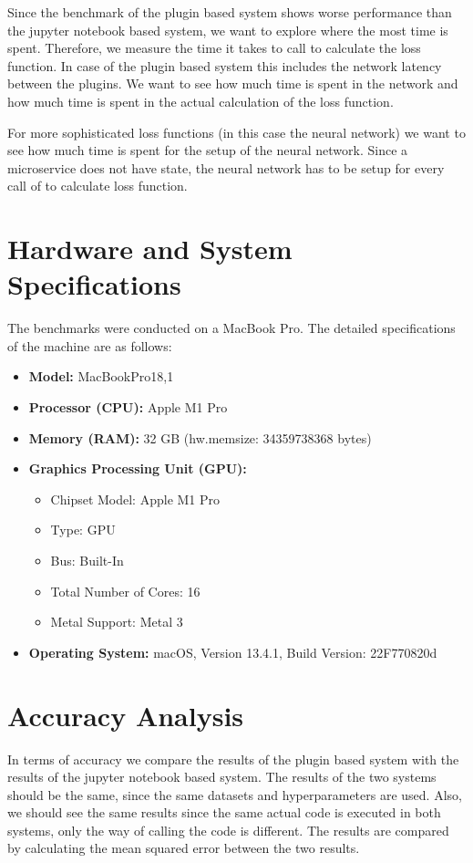 \documentclass[
  a4paper,  %
  twoside,  %
  bibliography=totoc,
  headsepline,
  cleardoublepage=empty,
  parskip=half,
  draft=false
]{scrbook}
\begin{document}
Since the benchmark of the plugin based system shows worse performance than the jupyter notebook based system, we want to explore where the most time is spent.
Therefore, we measure the time it takes to call to calculate the loss function.
In case of the plugin based system this includes the network latency between the plugins.
We want to see how much time is spent in the network and how much time is spent in the actual calculation of the loss function.

For more sophisticated loss functions (in this case the neural network) we want to see how much time is spent for the setup of the neural network.
Since a microservice does not have state, the neural network has to be setup for every call of to calculate loss function.

\section{Hardware and System Specifications}

The benchmarks were conducted on a MacBook Pro. The detailed specifications of the machine are as follows:

\begin{itemize}
    \item \textbf{Model:} MacBookPro18,1
    \item \textbf{Processor (CPU):} Apple M1 Pro
    \item \textbf{Memory (RAM):} 32 GB (hw.memsize: 34359738368 bytes)
    \item \textbf{Graphics Processing Unit (GPU):}
    \begin{itemize}
        \item Chipset Model: Apple M1 Pro
        \item Type: GPU
        \item Bus: Built-In
        \item Total Number of Cores: 16
        \item Metal Support: Metal 3
    \end{itemize}
    \item \textbf{Operating System:} macOS, Version 13.4.1, Build Version: 22F770820d
\end{itemize}


\section{Accuracy Analysis}
\label{sec:accuracyAnalysis}
In terms of accuracy we compare the results of the plugin based system with the results of the jupyter notebook based system.
The results of the two systems should be the same, since the same datasets and hyperparameters are used.
Also, we should see the same results since the same actual code is executed in both systems, only the way of calling the code is different.
The results are compared by calculating the mean squared error between the two results.
\end{document}
